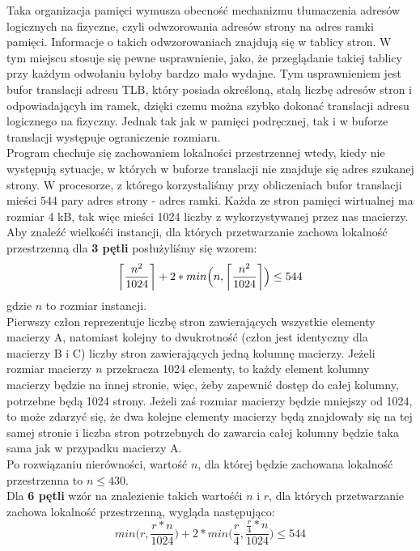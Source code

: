 \documentclass[10pt,a4paper]{article}
\DeclarePairedDelimiter\ceil{\lceil}{\rceil}
\begin{document}
Taka organizacja pamięci wymusza obecność mechanizmu tłumaczenia adresów logicznych
na fizyczne, czyli odwzorowania adresów strony na adres ramki pamięci. Informacje o takich
odwzorowaniach znajdują się w tablicy stron. W tym miejscu stosuje się pewne usprawnienie, jako, że
przeglądanie takiej tablicy przy każdym odwołaniu byłoby bardzo mało wydajne. Tym usprawnieniem
jest bufor translacji adresu TLB, który posiada określoną, stałą liczbę adresów stron i odpowiadającyh
im ramek, dzięki czemu można szybko dokonać translacji adresu logicznego na fizyczny.
Jednak tak jak w pamięci podręcznej, tak i w buforze translacji występuje ograniczenie rozmiaru.\\

Program chechuje się zachowaniem lokalności przestrzennej wtedy, kiedy nie występują sytuacje,
w których w buforze translacji nie znajduje się adres szukanej strony. W procesorze, z którego
korzystaliśmy przy obliczeniach bufor translacji mieści 544 pary adres strony - adres ramki.
Każda ze stron pamięci wirtualnej ma rozmiar 4 kB, tak więc mieści 1024 liczby z wykorzystywanej
przez nas macierzy.\\

Aby znaleźć wielkośći instancji, dla których przetwarzanie zachowa lokalność przestrzenną dla
\textbf{3 pętli} posłużyliśmy się wzorem:
\begin{equation}
	\ceil*{\frac{n^2}{1024}} + 2 * min\Big(n, \ceil*{\frac{n^2}{1024}}\Big) \leq 544
\end{equation}
gdzie $n$ to rozmiar instancji.\\

Pierwszy człon reprezentuje liczbę stron zawierających wszystkie elementy macierzy A, natomiast kolejny
to dwukrotność (człon jest identyczny dla macierzy B i C) liczby stron zawierających jedną kolumnę macierzy.
Jeżeli rozmiar macierzy $n$ przekracza 1024 elementy, to każdy element kolumny macierzy będzie na innej stronie,
więc, żeby zapewnić dostęp do całej kolumny, potrzebne będą 1024 strony. Jeżeli zaś rozmiar macierzy będzie
mniejszy od 1024, to może zdarzyć się, że dwa kolejne elementy macierzy będą znajdowały się na tej samej 
stronie i liczba stron potrzebnych do zawarcia całej kolumny będzie taka sama jak w przypadku macierzy A.\\

Po rozwiązaniu nierówności, wartość $n$, dla której będzie zachowana lokalność przestrzenna to $n \leq 430$.
\\

Dla \textbf{6 pętli} wzór na znalezienie takich wartośći $n$ i $r$, dla których przetwarzanie zachowa
lokalność przestrzenną, wygląda następująco:
\begin{equation}
	min\Big(r, \frac{r*n}{1024}\Big) + 2*min\Big(\frac{r}{4}, \frac{\frac{r}{4} * n}{1024}\Big) \leq 544
\end{equation}
\end{document}
